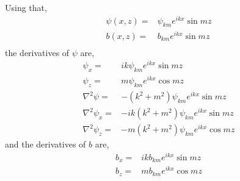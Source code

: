 \documentclass[11pt]{article}
\begin{document}
Using that,
\begin{align}
\psi(x,z) =& \psi_{km} e^{ikx} \sin mz \\
b(x,z) =& b_{km} e^{ikx} \sin mz \\
\end{align}
the derivatives of $\psi$ are,
\begin{align}
\psi_x =& ik\psi_{km} e^{ikx} \sin mz \\
\psi_z =& m \psi_{km} e^{ikx} \cos mz \\
\nabla^2 \psi =& -(k^2 + m^2) \psi_{km} e^{ikx} \sin mz \\
\nabla^2 \psi_x =& -i k (k^2 + m^2) \psi_{km} e^{ikx} \sin mz \\
\nabla^2 \psi_z =& -m (k^2 + m^2) \psi_{km} e^{ikx} \cos mz 
\end{align}
and the derivatives of $b$ are,
\begin{align}
b_x =& ik b_{km} e^{ikx} \sin mz \\
b_z =& m b_{km} e^{ikx} \cos mz
\end{align}
\end{document}
